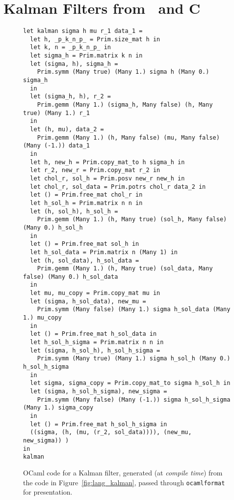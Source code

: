 \section{Kalman Filters from \lang\ and C}

\begin{figure}[tb]
    \centering
    \begin{verbatim}
let kalman sigma h mu r_1 data_1 =
  let h, _p_k_n_p_ = Prim.size_mat h in
  let k, n = _p_k_n_p_ in
  let sigma_h = Prim.matrix k n in
  let (sigma, h), sigma_h =
    Prim.symm (Many true) (Many 1.) sigma h (Many 0.) sigma_h
  in
  let (sigma_h, h), r_2 =
    Prim.gemm (Many 1.) (sigma_h, Many false) (h, Many true) (Many 1.) r_1
  in
  let (h, mu), data_2 =
    Prim.gemm (Many 1.) (h, Many false) (mu, Many false) (Many (-1.)) data_1
  in
  let h, new_h = Prim.copy_mat_to h sigma_h in
  let r_2, new_r = Prim.copy_mat r_2 in
  let chol_r, sol_h = Prim.posv new_r new_h in
  let chol_r, sol_data = Prim.potrs chol_r data_2 in
  let () = Prim.free_mat chol_r in
  let h_sol_h = Prim.matrix n n in
  let (h, sol_h), h_sol_h =
    Prim.gemm (Many 1.) (h, Many true) (sol_h, Many false) (Many 0.) h_sol_h
  in
  let () = Prim.free_mat sol_h in
  let h_sol_data = Prim.matrix n (Many 1) in
  let (h, sol_data), h_sol_data =
    Prim.gemm (Many 1.) (h, Many true) (sol_data, Many false) (Many 0.) h_sol_data
  in
  let mu, mu_copy = Prim.copy_mat mu in
  let (sigma, h_sol_data), new_mu =
    Prim.symm (Many false) (Many 1.) sigma h_sol_data (Many 1.) mu_copy
  in
  let () = Prim.free_mat h_sol_data in
  let h_sol_h_sigma = Prim.matrix n n in
  let (sigma, h_sol_h), h_sol_h_sigma =
    Prim.symm (Many true) (Many 1.) sigma h_sol_h (Many 0.) h_sol_h_sigma
  in
  let sigma, sigma_copy = Prim.copy_mat_to sigma h_sol_h in
  let (sigma, h_sol_h_sigma), new_sigma =
    Prim.symm (Many false) (Many (-1.)) sigma h_sol_h_sigma (Many 1.) sigma_copy
  in
  let () = Prim.free_mat h_sol_h_sigma in
  ((sigma, (h, (mu, (r_2, sol_data)))), (new_mu, new_sigma)) )
in
kalman
    \end{verbatim}
    \caption{OCaml code for a Kalman filter, generated (at \emph{compile time})
        from the code in Figure~\ref{fig:lang_kalman}, passed through
        \texttt{ocamlformat} for presentation.}\label{fig:ocaml_kalman}

\end{figure}

